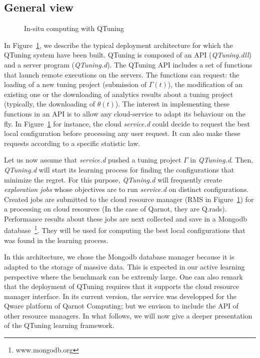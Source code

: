 \documentclass[10pt, conference, compsocconf]{IEEEtran}
\begin{document}
\subsection{General view}

	\begin{figure}[hbtp]
	\begin{center}
	
	\caption{In-situ computing with QTuning}
	\label{fig:QTuning}
	\end{center}
	\end{figure}


In Figure~\ref{fig:QTuning}, we describe the typical deployment architecture for which the
QTuning system have been built. QTuning is composed of an API ({\it QTuning.dll}) and
a server program ({\it QTuning.d}). The QTuning API includes a set of functions that
launch remote executions on the servers. The functions can request: the loading of a new tuning project (submission of
$\Gamma(t)$), the modification of an existing one or the downloading of analytics results about a tuning project
(typically, the downloading of $\theta(t)$). The interest in implementing these functions in an API is
to allow any cloud-service to adapt its behaviour on the fly. In Figure~\ref{fig:QTuning} for instance,
the cloud {\it service.d} could decide to request the best local configuration before processing any user request.
It can also make these requests according to a specific statistic law.

Let us now assume that {\it service.d} pushed a tuning project $\Gamma$ in  {\it QTuning.d}. Then,
{\it QTuning.d} will start its  learning process for finding the configurations that minimize the regret.
For this purpose, {\it QTuning.d} will frequently create {\it exploration jobs} whose objectives are to run
 {\it service.d} on distinct configurations. Created jobs are submitted to the cloud resource manager (RMS in
Figure~\ref{fig:QTuning}) for a processing on cloud resources (In the case of Qarnot, they are Q.rads).
Performance results about these jobs are next collected and save in a Mongodb database~\footnote{www.mongodb.org}.
They will be used for computing the best local configurations that was found in the learning process.

In this architecture, we chose the Mongodb database manager because it is adapted to the storage of massive data.
This is expected in our active learning perspective where the benchmark can be extremly large.
One can also remark that the deployment of QTuning requires that it supports the cloud resource manager
interface. In its current version, the service was developped for the Qware
platform of Qarnot Computing; but we envison to include the API of other resource managers.
In what follows, we will now give a deeper presentation of the QTuning learning framework.
\end{document}
